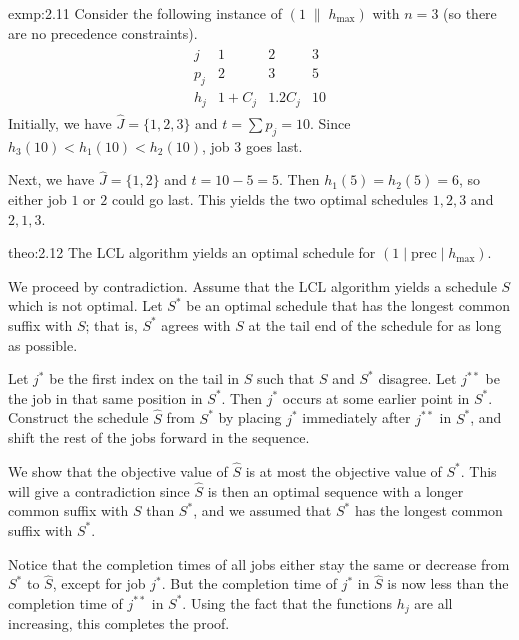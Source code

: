 \begin{exmp}{exmp:2.11}
    Consider the following instance of $(1\;\|\;h_{\max})$ with $n = 3$ 
    (so there are no precedence constraints). 
    \begin{align*}
        \begin{array}{c|ccc}
            j   & 1       & 2      & 3 \\ \hline
            p_j & 2       & 3      & 5 \\
            h_j & 1 + C_j & 1.2C_j & 10
        \end{array}
    \end{align*}
    Initially, we have $\hat J = \{1, 2, 3\}$ and $t = \sum p_j = 10$. 
    Since $h_3(10) < h_1(10) < h_2(10)$, job $3$ goes last. 

    Next, we have $\hat J = \{1, 2\}$ and $t = 10 - 5 = 5$. Then 
    $h_1(5) = h_2(5) = 6$, so either job $1$ or $2$ could go last. This 
    yields the two optimal schedules $1, 2, 3$ and $2, 1, 3$. 
\end{exmp}

\begin{theo}{theo:2.12}
    The LCL algorithm yields an optimal schedule for $(1 \mid \text{prec} \mid h_{\max})$. 
\end{theo}
\begin{pf}
    We proceed by contradiction. Assume that the LCL algorithm yields a 
    schedule $S$ which is not optimal. Let $S^*$ be an optimal schedule 
    that has the longest common suffix with $S$; that is, $S^*$ agrees 
    with $S$ at the tail end of the schedule for as long as possible. 

    Let $j^*$ be the first index on the tail in $S$ such that $S$ and $S^*$ 
    disagree. Let $j^{**}$ be the job in that same position in $S^*$. 
    Then $j^*$ occurs at some earlier point in $S^*$. Construct 
    the schedule $\hat S$ from $S^*$ by placing $j^*$ immediately after 
    $j^{**}$ in $S^*$, and shift the rest of the jobs forward 
    in the sequence. 

    We show that the objective value of $\hat S$ is at most the objective 
    value of $S^*$. This will give a contradiction since $\hat S$ is then 
    an optimal sequence with a longer common suffix with $S$ than $S^*$, 
    and we assumed that $S^*$ has the longest common suffix with $S^*$. 

    Notice that the completion times of all jobs either stay the same 
    or decrease from $S^*$ to $\hat S$, except for job $j^*$. But 
    the completion time of $j^*$ in $\hat S$ is now less than the 
    completion time of $j^{**}$ in $S^*$. Using the fact that the functions 
    $h_j$ are all increasing, this completes the proof. 
\end{pf}
